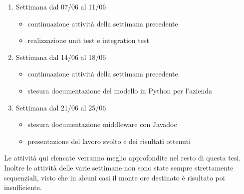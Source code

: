 \begin{enumerate}
    \item Settimana dal 07/06 al 11/06
    \begin{itemize}
        \item continuazione attività della settimana precedente
        \item realizzazione unit test e integration test
    \end{itemize}
    
    \item Settimana dal 14/06 al 18/06
    \begin{itemize}
        \item continuazione attività della settimana precedente
        \item stesura documentazione del modello in Python per l'azienda
    \end{itemize}
    
    \item Settimana dal 21/06 al 25/06
    \begin{itemize}
        \item stesura documentazione middleware con Javadoc
        \item presentazione del lavoro svolto e dei risultati ottenuti
    \end{itemize}
\end{enumerate}
Le attività qui elencate verranno meglio approfondite nel resto di questa tesi.
Inoltre le attività delle varie settimane non sono state sempre strettamente sequenziali, visto che in alcuni casi il monte ore destinato
è risultato poi insufficiente.